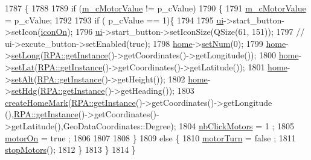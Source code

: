 \begin{DoxyCode}
1787                                      \{
1788 
1789     \textcolor{keywordflow}{if} (\hyperlink{a00008_abd98d48200b778114566cf554b7bfc20}{m\_cMotorValue} != p\_cValue)
1790     \{
1791         \hyperlink{a00008_abd98d48200b778114566cf554b7bfc20}{m\_cMotorValue} = p\_cValue;
1792 
1793         \textcolor{keywordflow}{if} ( p\_cValue == 1)\{
1794 
1795             \hyperlink{a00008_a6dc041ef6a2ffb329928d2913e8344e6}{ui}->start\_button->setIcon(\hyperlink{a00008_afa3cdab37d8290f081abb0c5fb137230}{iconOn});
1796             \hyperlink{a00008_a6dc041ef6a2ffb329928d2913e8344e6}{ui}->start\_button->setIconSize(QSize(61, 151));
1797            \textcolor{comment}{// ui->excute\_button->setEnabled(true);}
1798             \hyperlink{a00008_aff3d8bd7b2da805cc51487a7b3f7b6dd}{home}->\hyperlink{a00016_a14c494edc171ceb9b2934855efa3d994}{setNum}(0);
1799             \hyperlink{a00008_aff3d8bd7b2da805cc51487a7b3f7b6dd}{home}->\hyperlink{a00016_aaa12873d55502d21104ba3e24f6588c2}{setLong}(\hyperlink{a00012_a40277d38c94caf6125045994ba06f18f}{RPA::getInstance}()->getCoordinates()->getLongitude());
1800             \hyperlink{a00008_aff3d8bd7b2da805cc51487a7b3f7b6dd}{home}->\hyperlink{a00016_a8cc659fa52b3b0849781fb9056345773}{setLat}(\hyperlink{a00012_a40277d38c94caf6125045994ba06f18f}{RPA::getInstance}()->getCoordinates()->getLatitude());
1801             \hyperlink{a00008_aff3d8bd7b2da805cc51487a7b3f7b6dd}{home}->\hyperlink{a00016_ae85a2033b8fb23b94e8fa1f5dd2cec32}{setAlt}(\hyperlink{a00012_a40277d38c94caf6125045994ba06f18f}{RPA::getInstance}()->getHeight());
1802             \hyperlink{a00008_aff3d8bd7b2da805cc51487a7b3f7b6dd}{home}->\hyperlink{a00016_a34ff0642ba4c90e91effc59033cd1e02}{setHdg}(\hyperlink{a00012_a40277d38c94caf6125045994ba06f18f}{RPA::getInstance}()->getHeading());
1803             \hyperlink{a00008_a53f27da4e8969707ba7e8bc95c45a440}{createHomeMark}(\hyperlink{a00012_a40277d38c94caf6125045994ba06f18f}{RPA::getInstance}()->getCoordinates()->getLongitude
      (),\hyperlink{a00012_a40277d38c94caf6125045994ba06f18f}{RPA::getInstance}()->getCoordinates()->getLatitude(),GeoDataCoordinates::Degree);
1804             \hyperlink{a00008_a3e763e8c98add9ad72c168941a42c3da}{nbClickMotors} = 1 ;
1805             \hyperlink{a00008_acfbe2d728c783e901976703da6ee72f8}{motorOn} = true ;
1806 
1807 
1808         \}
1809         \textcolor{keywordflow}{else} \{
1810             \hyperlink{a00008_a67c2dd046c9c4c210cc892e5ac6e1d8b}{motorTurn} = false ;
1811             \hyperlink{a00008_a5260da8b51f5d97f6cf2a9ba11d1aee1}{stopMotors}();
1812         \}
1813     \}
1814 \}
\end{DoxyCode}
